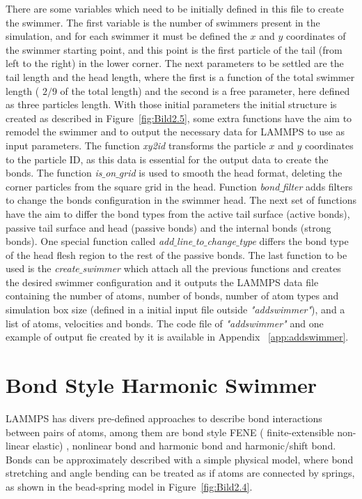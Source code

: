 There are some variables which need to be initially defined in this file to create the swimmer. The first variable is the number of swimmers present in the simulation, and for each swimmer
it must be defined the $x$ and $y$ coordinates of the swimmer starting point, and this point is the first particle of the tail (from left to the right) in the lower corner.
The next parameters to be settled are the tail length and the head length, where the first is a function of the total swimmer length ( $2/9$ of the total length) and the second is
a free parameter, here defined as three particles length. With those initial parameters the initial structure is created as described in Figure~\ref{fig:Bild2.5}, some extra functions
have the aim to remodel the swimmer and to output the necessary data for LAMMPS to use as input parameters. The function \textit{xy2id} transforms the particle $x$ and $y$ coordinates
to the particle ID, as this data is essential for the output data to create the bonds. The function \textit{is$\_$on$\_$grid} is used to smooth the head format, deleting the corner
particles from the square grid in the head. Function \textit{bond$\_$filter} adds filters to change the bonds configuration in the swimmer head. The next set of functions have the aim
to differ the bond types from the active tail surface (active bonds), passive tail surface and head (passive bonds) and the internal bonds (strong bonds). One special function called
\textit{add$\_$line$\_$to$\_$change$\_$type} differs the bond type of the head flesh region to the rest of the passive bonds. The last function to be used is the \textit{create$\_$swimmer}
which attach all the previous functions and creates the desired swimmer configuration and it outputs the LAMMPS data file containing the number of atoms, number of bonds, number of 
atom types and simulation box size (defined in a initial input file outside \textit{"addswimmer"}), and a list of atoms, velocities and bonds. The code file of \textit{"addswimmer"}
and one example of output fie created by it is available in Appendix ~\ref{app:addswimmer}.

\section{Bond Style Harmonic Swimmer}
\label{sec:section 3}

LAMMPS has divers pre-defined approaches to describe bond interactions between pairs of atoms, among them are bond style FENE ( finite-extensible non-linear elastic) , nonlinear bond and
harmonic bond and harmonic/shift bond. Bonds can be approximately described with a simple physical model, where bond stretching and angle bending can be treated as if atoms are connected by springs, as
shown in the bead-spring model in Figure~\ref{fig:Bild2.4}.\par

